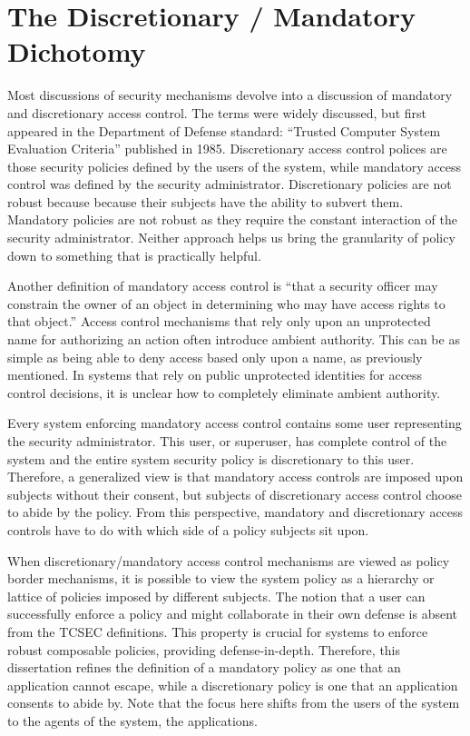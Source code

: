 \section[The Discretionary / Mandatory Dichotomy]{The Discretionary / Mandatory \\ Dichotomy}

Most discussions of security mechanisms devolve into a discussion of mandatory and discretionary access control.
The terms were widely discussed, but first appeared in the Department of Defense standard: ``Trusted Computer System Evaluation Criteria'' published in 1985.
Discretionary access control polices are those security policies defined by the users of the system, while mandatory access control was defined by the security administrator.
Discretionary policies are not robust because because their subjects have the ability to subvert them.
Mandatory policies are not robust as they require the constant interaction of the security administrator.
Neither approach helps us bring the granularity of policy down to something that is practically helpful.

Another definition of mandatory access control is ``that a security officer may constrain the owner of an object in determining who may have access rights to that object.'' \cite{Halevi05enforcingconfinement}
Access control mechanisms that rely only upon an unprotected name for authorizing an action often introduce ambient authority.
This can be as simple as being able to deny access based only upon a name, as previously mentioned.
In systems that rely on public unprotected identities for access control decisions, it is unclear how to completely eliminate ambient authority.

Every system enforcing mandatory access control contains some user representing the security administrator.
This user, or superuser, has complete control of the system and the entire system security policy is discretionary to this user.
Therefore, a generalized view is that mandatory access controls are imposed upon subjects without their consent, but subjects of discretionary access control choose to abide by the policy.
From this perspective, mandatory and discretionary access controls have to do with which side of a policy subjects sit upon.

When discretionary/mandatory access control mechanisms are viewed as policy border mechanisms, it is possible to view the system policy as a hierarchy or lattice of policies imposed by different subjects.
The notion that a user can successfully enforce a policy and might collaborate in their own defense is absent from the TCSEC definitions.
This property is crucial for systems to enforce robust composable policies, providing defense-in-depth.
Therefore, this dissertation refines the definition of a mandatory policy as one that an application cannot escape, while a discretionary policy is one that an application consents to abide by.
Note that the focus here shifts from the users of the system to the agents of the system, the applications.

